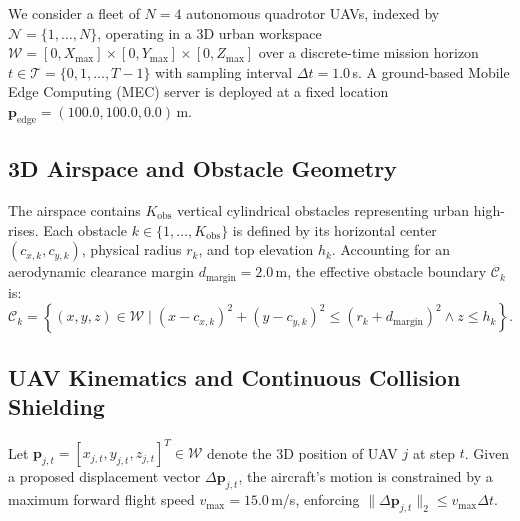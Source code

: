\documentclass[conference]{IEEEtran}
\begin{document}
We consider a fleet of $N = 4$ autonomous quadrotor UAVs, indexed by $\mathcal{N} = \{1, \dots, N\}$, operating in a 3D urban workspace $\mathcal{W} = [0, X_{\text{max}}] \times [0, Y_{\text{max}}] \times [0, Z_{\text{max}}]$ over a discrete-time mission horizon $t \in \mathcal{T} = \{0, 1, \dots, T-1\}$ with sampling interval $\Delta t = 1.0$\,s. A ground-based Mobile Edge Computing (MEC) server is deployed at a fixed location $\mathbf{p}_{\text{edge}} = (100.0, 100.0, 0.0)$\,m.

\subsection{3D Airspace and Obstacle Geometry}
The airspace contains $K_{\text{obs}}$ vertical cylindrical obstacles representing urban high-rises. Each obstacle $k \in \{1, \dots, K_{\text{obs}}\}$ is defined by its horizontal center $(c_{x,k}, c_{y,k})$, physical radius $r_k$, and top elevation $h_k$. Accounting for an aerodynamic clearance margin $d_{\text{margin}} = 2.0$\,m, the effective obstacle boundary $\mathcal{C}_k$ is:
\begin{equation}
\mathcal{C}_k = \left\{ (x, y, z) \in \mathcal{W} \mid (x - c_{x,k})^2 + (y - c_{y,k})^2 \le (r_k + d_{\text{margin}})^2 \land z \le h_k \right\}.
\end{equation}

\subsection{UAV Kinematics and Continuous Collision Shielding}
Let $\mathbf{p}_{j, t} = [x_{j,t}, y_{j,t}, z_{j,t}]^T \in \mathcal{W}$ denote the 3D position of UAV $j$ at step $t$. Given a proposed displacement vector $\Delta \mathbf{p}_{j, t}$, the aircraft's motion is constrained by a maximum forward flight speed $v_{\text{max}} = 15.0$\,m/s, enforcing $\|\Delta \mathbf{p}_{j, t}\|_2 \le v_{\text{max}} \Delta t$.
\end{document}
